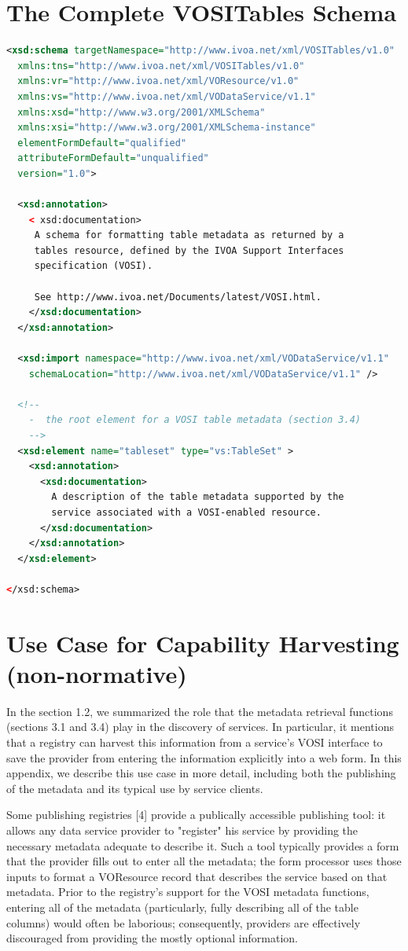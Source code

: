 \documentclass[11pt,letter]{ivoa}
\begin{document}
\section{The Complete VOSITables Schema}
\begin{lstlisting}[language=XML]
<xsd:schema targetNamespace="http://www.ivoa.net/xml/VOSITables/v1.0"
  xmlns:tns="http://www.ivoa.net/xml/VOSITables/v1.0"
  xmlns:vr="http://www.ivoa.net/xml/VOResource/v1.0"
  xmlns:vs="http://www.ivoa.net/xml/VODataService/v1.1"
  xmlns:xsd="http://www.w3.org/2001/XMLSchema"
  xmlns:xsi="http://www.w3.org/2001/XMLSchema-instance"
  elementFormDefault="qualified"
  attributeFormDefault="unqualified"
  version="1.0">

  <xsd:annotation>
    < xsd:documentation>
     A schema for formatting table metadata as returned by a 
     tables resource, defined by the IVOA Support Interfaces 
     specification (VOSI). 

     See http://www.ivoa.net/Documents/latest/VOSI.html.  
    </xsd:documentation>
  </xsd:annotation>

  <xsd:import namespace="http://www.ivoa.net/xml/VODataService/v1.1"
    schemaLocation="http://www.ivoa.net/xml/VODataService/v1.1" />

  <!--
    -  the root element for a VOSI table metadata (section 3.4)
    -->
  <xsd:element name="tableset" type="vs:TableSet" >
    <xsd:annotation>
      <xsd:documentation>
        A description of the table metadata supported by the 
        service associated with a VOSI-enabled resource.
      </xsd:documentation>
    </xsd:annotation>
  </xsd:element>

</xsd:schema>
\end{lstlisting}

\section{Use Case for Capability Harvesting (non-normative)}

 In the section 1.2, we summarized the role that the metadata retrieval functions (sections 3.1 and 3.4) play in the discovery of services. In particular, it mentions that a registry can harvest this information from a service's VOSI interface to save the provider from entering the information explicitly into a web form. In this appendix, we describe this use case in more detail, including both the publishing of the metadata and its typical use by service clients.

Some publishing registries [4] provide a publically accessible publishing tool: it allows any data service provider to "register" his service by providing the necessary metadata adequate to describe it. Such a tool typically provides a form that the provider fills out to enter all the metadata; the form processor uses those inputs to format a VOResource record that describes the service based on that metadata. Prior to the registry's support for the VOSI metadata functions, entering all of the metadata (particularly, fully describing all of the table columns) would often be laborious; consequently, providers are effectively discouraged from providing the mostly optional information.
\end{document}
